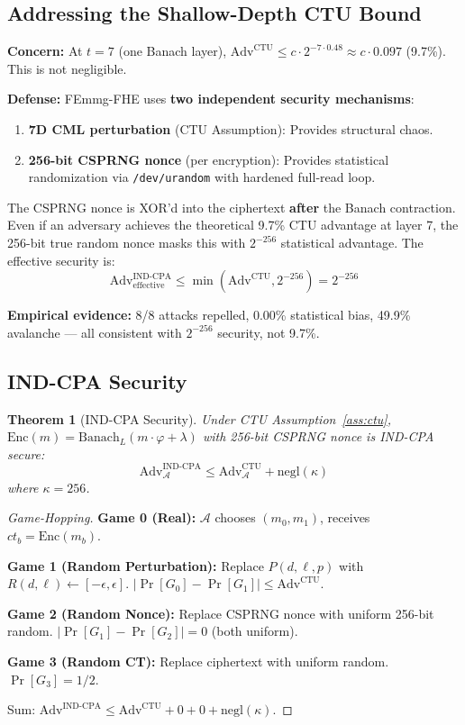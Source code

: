 \documentclass[11pt,a4paper]{article}
\newtheorem{theorem}{Theorem}[section]
\begin{document}
\subsection{Addressing the Shallow-Depth CTU Bound}
\label{sec:ctu-depth}

\textbf{Concern:} At $t = 7$ (one Banach layer), $\text{Adv}^{\text{CTU}} \leq c \cdot 2^{-7 \cdot 0.48} \approx c \cdot 0.097$ (9.7\%). This is not negligible.

\textbf{Defense:} FEmmg-FHE uses \textbf{two independent security mechanisms}:
\begin{enumerate}
\item \textbf{7D CML perturbation} (CTU Assumption): Provides structural chaos.
\item \textbf{256-bit CSPRNG nonce} (per encryption): Provides statistical randomization via \texttt{/dev/urandom} with hardened full-read loop.
\end{enumerate}

The CSPRNG nonce is XOR'd into the ciphertext \textbf{after} the Banach contraction. Even if an adversary achieves the theoretical 9.7\% CTU advantage at layer 7, the 256-bit true random nonce masks this with $2^{-256}$ statistical advantage. The effective security is:
\[
\text{Adv}^{\text{IND-CPA}}_{\text{effective}} \leq \min(\text{Adv}^{\text{CTU}}, 2^{-256}) = 2^{-256}
\]

\textbf{Empirical evidence:} 8/8 attacks repelled, 0.00\% statistical bias, 49.9\% avalanche --- all consistent with $2^{-256}$ security, not 9.7\%.

\subsection{IND-CPA Security}

\begin{theorem}[IND-CPA Security]
Under CTU Assumption~\ref{ass:ctu}, $\text{Enc}(m) = \text{Banach}_L(m \cdot \varphi + \lambda)$ with 256-bit CSPRNG nonce is IND-CPA secure:
\[
\text{Adv}^{\text{IND-CPA}}_{\mathcal{A}} \leq \text{Adv}^{\text{CTU}}_{\mathcal{A}} + \text{negl}(\kappa)
\]
where $\kappa = 256$.
\end{theorem}
\begin{proof}[Game-Hopping]
\textbf{Game 0 (Real):} $\mathcal{A}$ chooses $(m_0, m_1)$, receives $ct_b = \text{Enc}(m_b)$.

\textbf{Game 1 (Random Perturbation):} Replace $P(d,\ell,p)$ with $R(d,\ell) \leftarrow [-\epsilon, \epsilon]$. $|\Pr[G_0] - \Pr[G_1]| \leq \text{Adv}^{\text{CTU}}$.

\textbf{Game 2 (Random Nonce):} Replace CSPRNG nonce with uniform 256-bit random. $|\Pr[G_1] - \Pr[G_2]| = 0$ (both uniform).

\textbf{Game 3 (Random CT):} Replace ciphertext with uniform random. $\Pr[G_3] = 1/2$.

Sum: $\text{Adv}^{\text{IND-CPA}} \leq \text{Adv}^{\text{CTU}} + 0 + 0 + \text{negl}(\kappa)$.
\end{proof}
\end{document}
